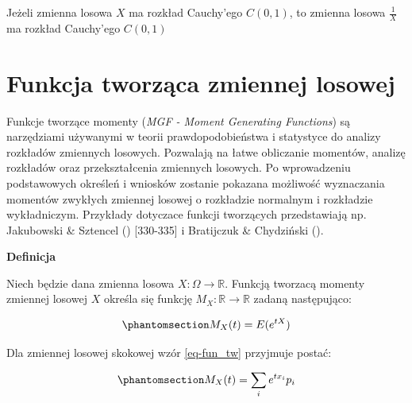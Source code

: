 \documentclass[
  letterpaper,
  DIV=11,
  numbers=noendperiod]{scrreprt}
\begin{document}
\begin{tcolorbox}[enhanced jigsaw, toprule=.15mm, title=\textcolor{quarto-callout-tip-color}{\faLightbulb}\hspace{0.5em}{Rozkład Cauchy'go i rozkład Cauchy'ego}, breakable, coltitle=black, titlerule=0mm, colbacktitle=quarto-callout-tip-color!10!white, opacitybacktitle=0.6, opacityback=0, bottomtitle=1mm, left=2mm, arc=.35mm, leftrule=.75mm, bottomrule=.15mm, rightrule=.15mm, toptitle=1mm, colframe=quarto-callout-tip-color-frame, colback=white]

Jeżeli zmienna losowa \(X\) ma rozkład Cauchy'ego \(C(0,1)\), to zmienna
losowa \(\frac{1}{X}\) ma rozkład Cauchy'ego \(C(0,1)\)

\end{tcolorbox}

\section{Funkcja tworząca zmiennej
losowej}\label{funkcja-tworzux105ca-zmiennej-losowej}

Funkcje tworzące momenty (\emph{MGF - Moment Generating Functions}) są
narzędziami używanymi w teorii prawdopodobieństwa i statystyce do
analizy rozkładów zmiennych losowych. Pozwalają na łatwe obliczanie
momentów, analizę rozkładów oraz przekształcenia zmiennych losowych. Po
wprowadzeniu podstawowych określeń i wniosków zostanie pokazana
możliwość wyznaczania momentów zwykłych zmiennej losowej o rozkładzie
normalnym i rozkładzie wykładniczym. Przykłady dotyczace funkcji
tworzących przedstawiają np. Jakubowski \& Sztencel
() {[}330-335{]} i Bratijczuk \&
Chydziński ().

\textbf{Definicja}

Niech będzie dana zmienna losowa \(X: \Omega \to \mathbb{R}\). Funkcją
tworzacą momenty zmiennej losowej \(X\) określa się funkcję
\(M_X: \mathbb{R} \to \mathbb{R}\) zadaną następująco:

\begin{equation}\phantomsection\label{eq-fun_tw}{ M_X(t) = E(e^{tX})}\end{equation}

Dla zmiennej losowej skokowej wzór \ref{eq-fun_tw} przyjmuje postać:

\begin{equation}\phantomsection\label{eq-fun_tw_sk}{M_X(t)  = \sum_i e^{tx_i}p_i}\end{equation}
\end{document}
